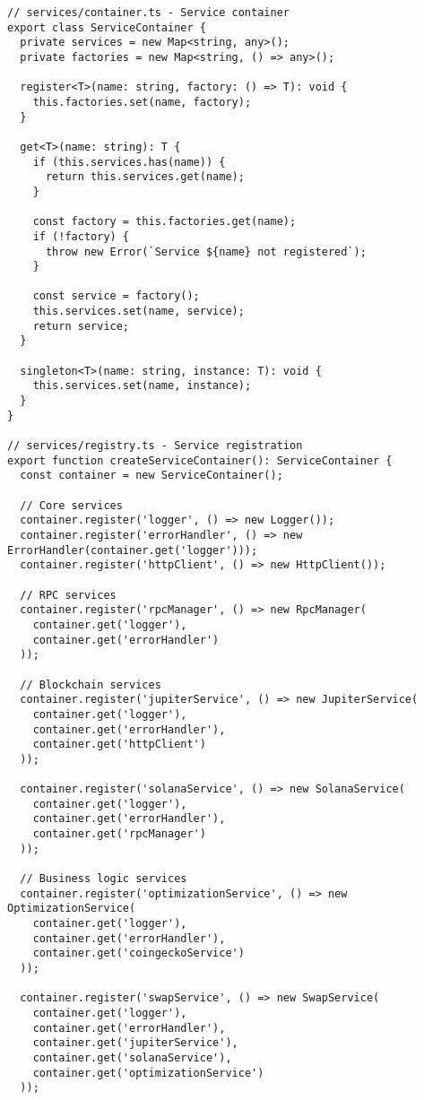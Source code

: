 \documentclass[11pt,a4paper]{article}
\begin{document}
\begin{lstlisting}[style=typescript, caption=Service Container and Dependency Injection]
// services/container.ts - Service container
export class ServiceContainer {
  private services = new Map<string, any>();
  private factories = new Map<string, () => any>();
  
  register<T>(name: string, factory: () => T): void {
    this.factories.set(name, factory);
  }
  
  get<T>(name: string): T {
    if (this.services.has(name)) {
      return this.services.get(name);
    }
    
    const factory = this.factories.get(name);
    if (!factory) {
      throw new Error(`Service ${name} not registered`);
    }
    
    const service = factory();
    this.services.set(name, service);
    return service;
  }
  
  singleton<T>(name: string, instance: T): void {
    this.services.set(name, instance);
  }
}

// services/registry.ts - Service registration
export function createServiceContainer(): ServiceContainer {
  const container = new ServiceContainer();
  
  // Core services
  container.register('logger', () => new Logger());
  container.register('errorHandler', () => new ErrorHandler(container.get('logger')));
  container.register('httpClient', () => new HttpClient());
  
  // RPC services
  container.register('rpcManager', () => new RpcManager(
    container.get('logger'),
    container.get('errorHandler')
  ));
  
  // Blockchain services
  container.register('jupiterService', () => new JupiterService(
    container.get('logger'),
    container.get('errorHandler'),
    container.get('httpClient')
  ));
  
  container.register('solanaService', () => new SolanaService(
    container.get('logger'),
    container.get('errorHandler'),
    container.get('rpcManager')
  ));
  
  // Business logic services
  container.register('optimizationService', () => new OptimizationService(
    container.get('logger'),
    container.get('errorHandler'),
    container.get('coingeckoService')
  ));
  
  container.register('swapService', () => new SwapService(
    container.get('logger'),
    container.get('errorHandler'),
    container.get('jupiterService'),
    container.get('solanaService'),
    container.get('optimizationService')
  ));
  

\end{lstlisting}
\end{document}
